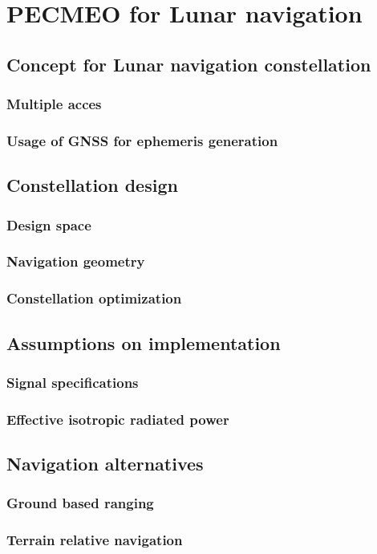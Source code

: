 \chapter{PECMEO for Lunar navigation}

\section{Concept for Lunar navigation constellation}
\subsection{Multiple acces}
\subsection{Usage of GNSS for ephemeris generation}


\section{Constellation design}
\subsection{Design space}
\subsection{Navigation geometry}
\subsection{Constellation optimization}

\section{Assumptions on implementation}
\subsection{Signal specifications}
\subsection{Effective isotropic radiated power}

\section{Navigation alternatives}
\subsection{Ground based ranging}
\subsection{Terrain relative navigation}